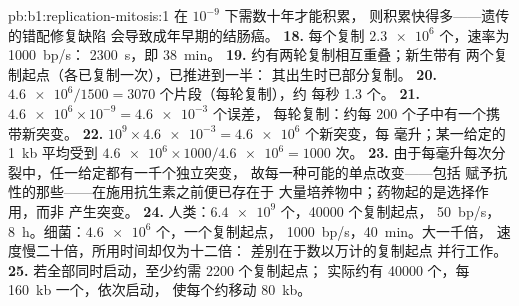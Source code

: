 \begin{solution}{pb:b1:replication-mitosis:1}
在 $10^{-9}$ 下需数十年才能积累，
则积累快得多——遗传的错配修复缺陷
会导致成年早期的结肠癌。
\textbf{18.} 每个复制 $\num{2.3e6}$ 个，速率为 \qty{1000}{bp/s}：
\qty{2300}{s}，即 \qty{38}{min}。
\textbf{19.} 约有两轮复制相互重叠；新生带有
两个复制起点（各已复制一次），已推进到一半：
其出生时已部分复制。
\textbf{20.} $\num{4.6e6}/1500 = 3070$ 个片段（每轮复制），约
每秒 1.3 个。
\textbf{21.} $\num{4.6e6}\times 10^{-9} = \num{4.6e-3}$ 个误差，
每轮复制：约每 200 个子中有一个携带新突变。
\textbf{22.} $10^9\times\num{4.6e-3} = \num{4.6e6}$ 个新突变，每
毫升；某一给定的 \qty{1}{kb} 平均受到 $\num{4.6e6}\times
1000/\num{4.6e6} = 1000$ 次。
\textbf{23.} 由于每毫升每次分裂中，任一给定都有一千个独立突变，
故每一种可能的单点改变——包括
赋予抗性的那些——在施用抗生素之前便已存在于
大量培养物中；药物起的是选择作用，而非
产生突变。
\textbf{24.} 人类：$\num{6.4e9}$ 个，\num{40000} 个复制起点，
\qty{50}{bp/s}，\qty{8}{h}。细菌：$\num{4.6e6}$ 个，一个复制起点，
\qty{1000}{bp/s}，\qty{40}{min}。大一千倍，
速度慢二十倍，所用时间却仅为十二倍：
差别在于数以万计的复制起点
并行工作。
\textbf{25.} 若全部同时启动，至少约需 \num{2200} 个复制起点；
实际约有 \num{40000} 个，每 \qty{160}{kb} 一个，依次启动，
使每个约移动 \qty{80}{kb}。
\end{solution}
